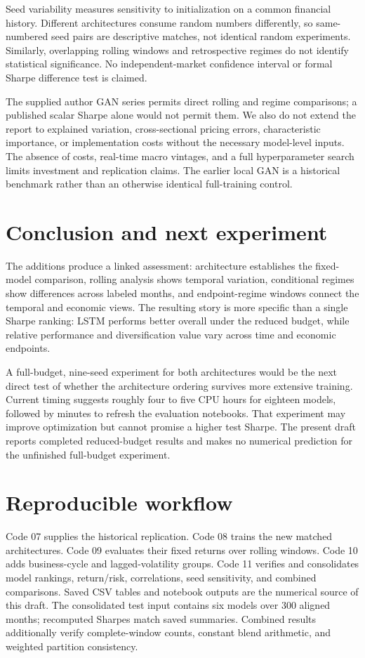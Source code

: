 \documentclass[11pt]{article}
\begin{document}
Seed variability measures sensitivity to initialization on a common financial history. Different architectures consume random numbers differently, so same-numbered seed pairs are descriptive matches, not identical random experiments. Similarly, overlapping rolling windows and retrospective regimes do not identify statistical significance. No independent-market confidence interval or formal Sharpe difference test is claimed.

The supplied author GAN series permits direct rolling and regime comparisons; a published scalar Sharpe alone would not permit them. We also do not extend the report to explained variation, cross-sectional pricing errors, characteristic importance, or implementation costs without the necessary model-level inputs. The absence of costs, real-time macro vintages, and a full hyperparameter search limits investment and replication claims. The earlier local GAN is a historical benchmark rather than an otherwise identical full-training control.
\section{Conclusion and next experiment}
The additions produce a linked assessment: architecture establishes the fixed-model comparison, rolling analysis shows temporal variation, conditional regimes show differences across labeled months, and endpoint-regime windows connect the temporal and economic views. The resulting story is more specific than a single Sharpe ranking: LSTM performs better overall under the reduced budget, while relative performance and diversification value vary across time and economic endpoints.

A full-budget, nine-seed experiment for both architectures would be the next direct test of whether the architecture ordering survives more extensive training. Current timing suggests roughly four to five CPU hours for eighteen models, followed by minutes to refresh the evaluation notebooks. That experiment may improve optimization but cannot promise a higher test Sharpe. The present draft reports completed reduced-budget results and makes no numerical prediction for the unfinished full-budget experiment.
\appendix
\section{Reproducible workflow}
Code 07 supplies the historical replication. Code 08 trains the new matched architectures. Code 09 evaluates their fixed returns over rolling windows. Code 10 adds business-cycle and lagged-volatility groups. Code 11 verifies and consolidates model rankings, return/risk, correlations, seed sensitivity, and combined comparisons. Saved CSV tables and notebook outputs are the numerical source of this draft. The consolidated test input contains six models over 300 aligned months; recomputed Sharpes match saved summaries. Combined results additionally verify complete-window counts, constant blend arithmetic, and weighted partition consistency.
\end{document}
